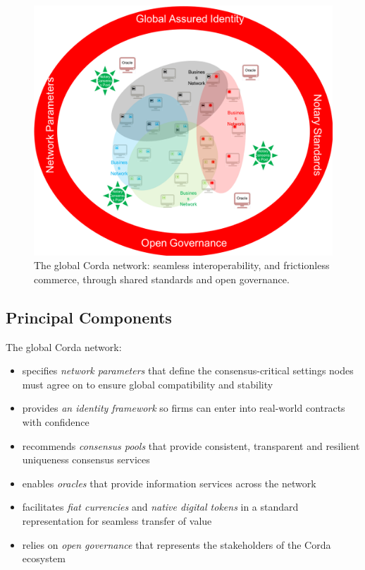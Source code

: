 \documentclass{article}
\begin{document}
\begin{figure}[H]
    \includegraphics[scale = .5, center]{corda-connect}
    \caption{The global Corda network: seamless interoperability, and frictionless commerce, through shared standards and open governance.}
\end{figure}

\subsection{Principal Components}

The global Corda network:
\begin{itemize}
    \item specifies \textit{network parameters} that define the consensus-critical settings nodes must agree on to ensure global compatibility and stability
    \item provides \textit{an identity framework} so firms can enter into real-world contracts with confidence
    \item recommends \textit{consensus pools} that provide consistent, transparent and resilient uniqueness consensus services
    \item enables \textit{oracles} that provide information services across the network
    \item facilitates \textit{fiat currencies} and \textit{native digital tokens} in a standard representation for seamless transfer of value
    \item relies on \textit{open governance} that represents the stakeholders of the Corda ecosystem
\end{itemize}
\end{document}

